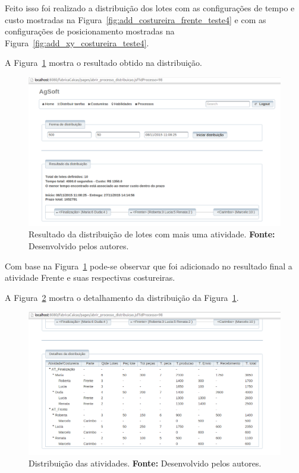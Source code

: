 \par Feito isso foi realizado a distribuição dos lotes com as configurações de
tempo e custo mostradas na Figura~\ref{fig:add_costureira_frente_teste4} e com
as configurações de posicionamento mostradas na Figura~\ref{fig:add_xy_costureira_teste4}.
\par A Figura~\ref{fig:resultado1_teste5} mostra o resultado obtido na
distribuição.



\begin{figure}[h!]
	\centerline{\includegraphics[scale=0.3]{./imagens/resultado1_teste5.png}}
	\caption[Resultado da distribuição de lotes com mais uma atividade.]
	{Resultado da distribuição de lotes com mais uma atividade. \textbf{Fonte:} Desenvolvido pelos
	autores.}
	\label{fig:resultado1_teste5}
\end{figure}

\par Com base na Figura~\ref{fig:resultado1_teste5} pode-se observar que foi
adicionado no resultado final a atividade Frente e suas respectivas costureiras.

\par A Figura~\ref{fig:detalhamento1_teste5} mostra o detalhamento da
distribuição da Figura~\ref{fig:resultado1_teste5}.

\newpage

\begin{figure}[h!]
	\centerline{\includegraphics[scale=0.3]{./imagens/detalhamento1_teste5.png}}
	\caption[Distribuição das atividades.]
	{Distribuição das atividades. \textbf{Fonte:} Desenvolvido pelos
	autores.}
	\label{fig:detalhamento1_teste5}
\end{figure}

